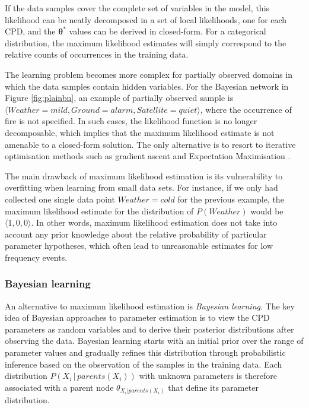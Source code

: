 If the data samples cover the complete set of variables in the model, this likelihood can be neatly decomposed in a set of local likelihoods, one for each CPD, and the $\boldsymbol\theta^*$ values can be derived in closed-form. For a categorical distribution,  the maximum likelihood estimates will simply correspond to the relative counts of occurrences in the training data. 


The learning problem becomes more complex for partially observed domains in which the data samples contain hidden variables.  For the Bayesian network in Figure \ref{fig:plainbn}, an example of partially observed sample is $\langle \mathit{Weather}\!=\!\mathit{mild}, \mathit{Ground}\!=\!alarm, \mathit{Satellite} \!=\!quiet\rangle$, where the occurrence of fire is not specified.  In such cases, the likelihood function is no longer decomposable, which implies that the maximum likelihood estimate is not amenable to a closed-form solution. The only alternative is to resort to iterative optimisation methods such as gradient ascent \citep{binder1997} and Expectation Maximisation \citep{green1990}. 

The main drawback of maximum likelihood estimation is its vulnerability to overfitting when learning from small data sets. For instance, if we only had collected one single data point $\mathit{Weather}\!=\!\mathit{cold}$ for the previous example, the maximum likelihood estimate for the distribution of $P(\mathit{Weather})$ would be $\langle 1, 0,0\rangle$.  In other words, maximum likelihood estimation does not take into account any prior knowledge about the relative probability of particular parameter hypotheses, which often lead to unreasonable estimates for low frequency events. 

\subsubsection*{Bayesian learning}

An alternative to maximum likelihood estimation is \textit{Bayesian learning}.  The key idea of Bayesian approaches to parameter estimation is to view the CPD parameters as random variables and to derive their posterior distributions after observing the data.  Bayesian learning starts with an initial prior over the range of parameter values and gradually refines this distribution through probabilistic inference based on the observation of the samples in the training data. Each distribution $P(X_i \, | \, parents(X_i))$ with unknown parameters is therefore associated with a parent node $\theta_{X_i|parents(X_i)}$ that define its parameter distribution.  

